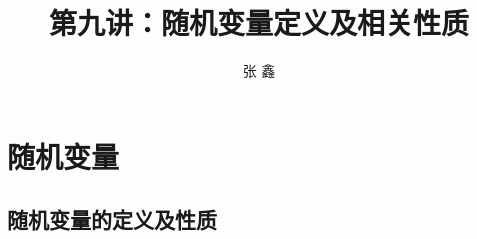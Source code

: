 \section{随机变量}
\title [概率论]{第九讲：随机变量定义及相关性质}
\author [张鑫 {\rm Email: xzhangseu@seu.edu.cn} ]{\large 张 鑫}
\date{}



{ 
	\begin{frame}
		\titlepage
	\end{frame}
}

\addtocounter{framenumber}{-3}  %

\subsection{随机变量的定义及性质}


